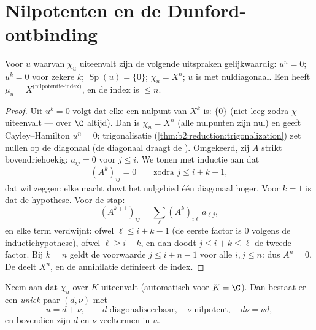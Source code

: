 \section{Nilpotenten en de Dunford-ontbinding}

\begin{proposition}\label{prop:b2:reduction:nilpotent}
Voor $u$ waarvan $\chi_u$ uiteenvalt zijn de volgende uitspraken
gelijkwaardig: $u^n = 0$; $u^k = 0$ voor zekere $k$;
$\operatorname{Sp}(u) = \{0\}$; $\chi_u = X^n$; $u$ is
 met nuldiagonaal. Een 
heeft $\mu_u = X^{\text{(nilpotentie-index)}}$, en de index is
$\leq n$.
\end{proposition}

\begin{proof}
Uit $u^k = 0$ volgt dat elke  een nulpunt van $X^k$ is:
 $\{0\}$ (niet leeg zodra $\chi$ uiteenvalt --- over $\C$
altijd). Dan is $\chi_u = X^n$ (alle nulpunten zijn nul) en geeft
Cayley--Hamilton $u^n = 0$; trigonalisatie
(\cref{thm:b2:reduction:trigonalization}) zet nullen op de
diagonaal (de diagonaal draagt de ). Omgekeerd, zij $A$
strikt bovendriehoekig: $a_{ij} = 0$ voor $j \leq i$. We tonen met
inductie aan dat
\[
(A^k)_{ij} = 0 \qquad \text{zodra } j \leq i + k - 1,
\]
dat wil zeggen: elke macht duwt het nulgebied één diagonaal hoger.
Voor $k = 1$ is dat de hypothese. Voor de stap:
\[
(A^{k+1})_{ij} = \sum_{\ell} (A^k)_{i\ell}\,a_{\ell j} ,
\]
en elke term verdwijnt: ofwel $\ell \leq i + k - 1$ (de eerste
factor is $0$ volgens de inductiehypothese), ofwel $\ell \geq i +
k$, en dan doodt $j \leq i + k \leq \ell$ de tweede factor. Bij $k
= n$ geldt de voorwaarde $j \leq i + n - 1$ voor alle $i, j \leq
n$: dus $A^n = 0$. De  deelt $X^n$, en de
annihilatie definieert de index.
\end{proof}

\begin{theorem}\label{thm:b2:reduction:dunford}
Neem aan dat $\chi_u$ over $K$ uiteenvalt (automatisch voor $K =
\C$). Dan bestaat er een \emph{uniek} paar $(d, \nu)$ met
\[
u = d + \nu, \qquad d \text{ diagonaliseerbaar}, \quad \nu
\text{ nilpotent}, \quad d\nu = \nu d ,
\]
en bovendien zijn $d$ en $\nu$ veeltermen in
$u$.
\end{theorem}

